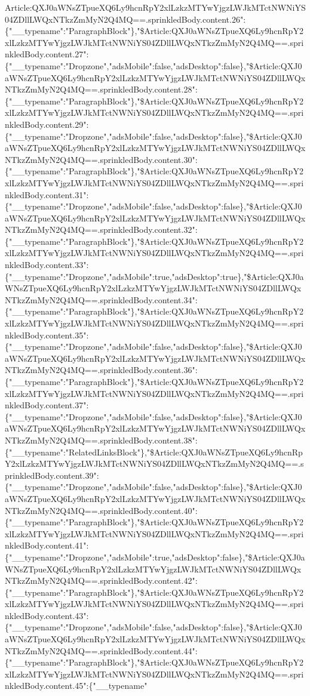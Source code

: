 Article:QXJ0aWNsZTpueXQ6Ly9hcnRpY2xlLzkzMTYwYjgzLWJkMTctNWNiYS04ZDllLWQxNTkzZmMyN2Q4MQ==.sprinkledBody.content.26":\{"\_\_typename":"ParagraphBlock"\},"\$Article:QXJ0aWNsZTpueXQ6Ly9hcnRpY2xlLzkzMTYwYjgzLWJkMTctNWNiYS04ZDllLWQxNTkzZmMyN2Q4MQ==.sprinkledBody.content.27":\{"\_\_typename":"Dropzone","adsMobile":false,"adsDesktop":false\},"\$Article:QXJ0aWNsZTpueXQ6Ly9hcnRpY2xlLzkzMTYwYjgzLWJkMTctNWNiYS04ZDllLWQxNTkzZmMyN2Q4MQ==.sprinkledBody.content.28":\{"\_\_typename":"ParagraphBlock"\},"\$Article:QXJ0aWNsZTpueXQ6Ly9hcnRpY2xlLzkzMTYwYjgzLWJkMTctNWNiYS04ZDllLWQxNTkzZmMyN2Q4MQ==.sprinkledBody.content.29":\{"\_\_typename":"Dropzone","adsMobile":false,"adsDesktop":false\},"\$Article:QXJ0aWNsZTpueXQ6Ly9hcnRpY2xlLzkzMTYwYjgzLWJkMTctNWNiYS04ZDllLWQxNTkzZmMyN2Q4MQ==.sprinkledBody.content.30":\{"\_\_typename":"ParagraphBlock"\},"\$Article:QXJ0aWNsZTpueXQ6Ly9hcnRpY2xlLzkzMTYwYjgzLWJkMTctNWNiYS04ZDllLWQxNTkzZmMyN2Q4MQ==.sprinkledBody.content.31":\{"\_\_typename":"Dropzone","adsMobile":false,"adsDesktop":false\},"\$Article:QXJ0aWNsZTpueXQ6Ly9hcnRpY2xlLzkzMTYwYjgzLWJkMTctNWNiYS04ZDllLWQxNTkzZmMyN2Q4MQ==.sprinkledBody.content.32":\{"\_\_typename":"ParagraphBlock"\},"\$Article:QXJ0aWNsZTpueXQ6Ly9hcnRpY2xlLzkzMTYwYjgzLWJkMTctNWNiYS04ZDllLWQxNTkzZmMyN2Q4MQ==.sprinkledBody.content.33":\{"\_\_typename":"Dropzone","adsMobile":true,"adsDesktop":true\},"\$Article:QXJ0aWNsZTpueXQ6Ly9hcnRpY2xlLzkzMTYwYjgzLWJkMTctNWNiYS04ZDllLWQxNTkzZmMyN2Q4MQ==.sprinkledBody.content.34":\{"\_\_typename":"ParagraphBlock"\},"\$Article:QXJ0aWNsZTpueXQ6Ly9hcnRpY2xlLzkzMTYwYjgzLWJkMTctNWNiYS04ZDllLWQxNTkzZmMyN2Q4MQ==.sprinkledBody.content.35":\{"\_\_typename":"Dropzone","adsMobile":false,"adsDesktop":false\},"\$Article:QXJ0aWNsZTpueXQ6Ly9hcnRpY2xlLzkzMTYwYjgzLWJkMTctNWNiYS04ZDllLWQxNTkzZmMyN2Q4MQ==.sprinkledBody.content.36":\{"\_\_typename":"ParagraphBlock"\},"\$Article:QXJ0aWNsZTpueXQ6Ly9hcnRpY2xlLzkzMTYwYjgzLWJkMTctNWNiYS04ZDllLWQxNTkzZmMyN2Q4MQ==.sprinkledBody.content.37":\{"\_\_typename":"Dropzone","adsMobile":false,"adsDesktop":false\},"\$Article:QXJ0aWNsZTpueXQ6Ly9hcnRpY2xlLzkzMTYwYjgzLWJkMTctNWNiYS04ZDllLWQxNTkzZmMyN2Q4MQ==.sprinkledBody.content.38":\{"\_\_typename":"RelatedLinksBlock"\},"\$Article:QXJ0aWNsZTpueXQ6Ly9hcnRpY2xlLzkzMTYwYjgzLWJkMTctNWNiYS04ZDllLWQxNTkzZmMyN2Q4MQ==.sprinkledBody.content.39":\{"\_\_typename":"Dropzone","adsMobile":false,"adsDesktop":false\},"\$Article:QXJ0aWNsZTpueXQ6Ly9hcnRpY2xlLzkzMTYwYjgzLWJkMTctNWNiYS04ZDllLWQxNTkzZmMyN2Q4MQ==.sprinkledBody.content.40":\{"\_\_typename":"ParagraphBlock"\},"\$Article:QXJ0aWNsZTpueXQ6Ly9hcnRpY2xlLzkzMTYwYjgzLWJkMTctNWNiYS04ZDllLWQxNTkzZmMyN2Q4MQ==.sprinkledBody.content.41":\{"\_\_typename":"Dropzone","adsMobile":true,"adsDesktop":false\},"\$Article:QXJ0aWNsZTpueXQ6Ly9hcnRpY2xlLzkzMTYwYjgzLWJkMTctNWNiYS04ZDllLWQxNTkzZmMyN2Q4MQ==.sprinkledBody.content.42":\{"\_\_typename":"ParagraphBlock"\},"\$Article:QXJ0aWNsZTpueXQ6Ly9hcnRpY2xlLzkzMTYwYjgzLWJkMTctNWNiYS04ZDllLWQxNTkzZmMyN2Q4MQ==.sprinkledBody.content.43":\{"\_\_typename":"Dropzone","adsMobile":false,"adsDesktop":false\},"\$Article:QXJ0aWNsZTpueXQ6Ly9hcnRpY2xlLzkzMTYwYjgzLWJkMTctNWNiYS04ZDllLWQxNTkzZmMyN2Q4MQ==.sprinkledBody.content.44":\{"\_\_typename":"ParagraphBlock"\},"\$Article:QXJ0aWNsZTpueXQ6Ly9hcnRpY2xlLzkzMTYwYjgzLWJkMTctNWNiYS04ZDllLWQxNTkzZmMyN2Q4MQ==.sprinkledBody.content.45":\{"\_\_typename"